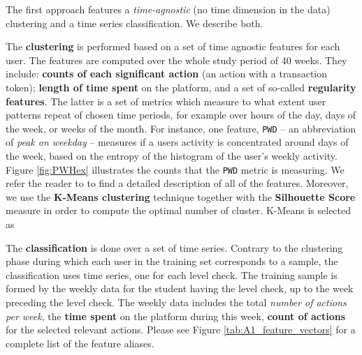 \documentclass[sigplan,screen]{acmart}
\begin{document}
The first approach features a \textit{time-agnostic} (no time dimension in the data) clustering and a time series classification. We describe both.

The \textbf{clustering} is performed based on a set of time agnostic features for each user. The features are computed over the whole study period of 40 weeks. They include: \textbf{counts of each significant action} (an action with a transaction token); \textbf{length of time spent} on the platform, and a set of so-called \textbf{regularity features}\cite{quantifyreg}. The latter is a set of metrics which measure to what extent user patterns repeat of chosen time periods, for example over hours of the day, days of the week, or weeks of the month. For instance, one feature, \texttt{PWD} -- an abbreviation of \textit{peak on weekday} -- measures if a users activity is concentrated around days of the week, based on the entropy of the histogram of the user's weekly activity. Figure \ref{fig:PWHex} illustrates the counts that the \texttt{PWD} metric is measuring. We refer the reader to \cite{quantifyreg} to find a detailed description of all of the features. Moreover, we use the \textbf{K-Means clustering} technique together with the \textbf{Silhouette Score} measure in order to compute the optimal number of cluster. K-Means is selected as 

The \textbf{classification} is done over a set of time series. Contrary to the clustering phase during which each user in the training set corresponds to a sample, the classification uses time series, one for each level check. The training sample is formed by the weekly data for the student having the level check, up to the week preceding the level check. The weekly data includes the total \textit{number of actions per week}, the \textbf{time spent} on the platform during this week, \textbf{count of actions} for the selected relevant actions. Please see Figure \ref{tab:A1_feature_vectors} for a complete list of the feature aliases.
\end{document}
